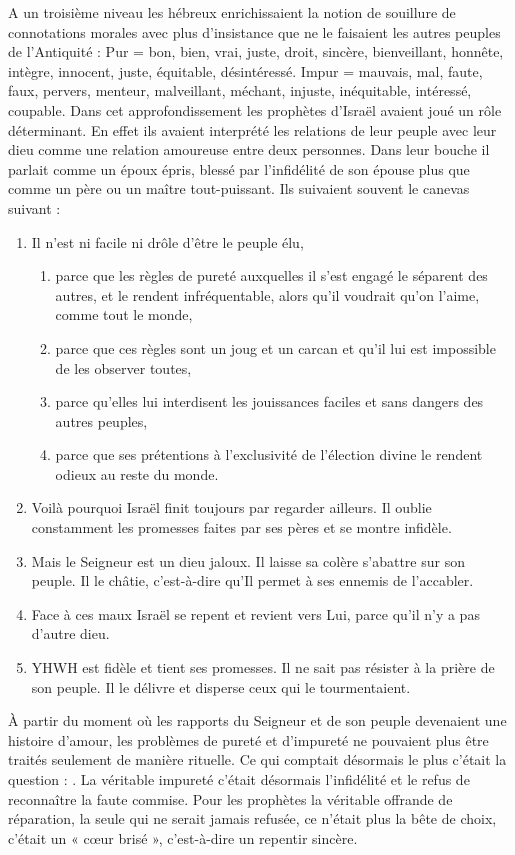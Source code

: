  A un troisième niveau les hébreux enrichissaient la notion de souillure de connotations morales avec plus d'insistance que ne le faisaient les autres peuples de l'Antiquité : Pur = bon, bien, vrai, juste, droit, sincère, bienveillant, honnête, intègre, innocent, juste, équitable, désintéressé. Impur = mauvais, mal, faute, faux, pervers, menteur, malveillant, méchant, injuste, inéquitable, intéressé, coupable. Dans cet approfondissement les prophètes d'Israël avaient joué un rôle déterminant. En effet ils avaient interprété les relations de leur peuple avec leur dieu comme une relation amoureuse entre deux personnes. Dans leur bouche il parlait comme un époux épris, blessé par l'infidélité de son épouse plus que comme un père ou un maître tout-puissant. 
Ils suivaient souvent le canevas suivant :
\begin{enumerate}
\item Il n'est ni facile ni drôle d'être le peuple élu,
 \begin{enumerate}
 \item parce que les règles de pureté auxquelles il s'est engagé le séparent des autres, et le rendent infréquentable, alors qu'il voudrait qu'on l'aime, comme tout le monde,
 \item parce que ces règles sont un joug et un carcan et qu'il lui est impossible de les observer toutes,
 \item parce qu'elles lui interdisent les jouissances faciles et sans dangers des autres peuples,
 \item parce que ses prétentions à l'exclusivité de l'élection divine le rendent odieux au reste du monde. 
 \end{enumerate}
\item Voilà pourquoi Israël finit toujours par regarder ailleurs. Il oublie constamment les promesses faites par ses pères et se montre infidèle. 
\item Mais le Seigneur est un dieu jaloux. Il laisse sa colère s'abattre sur son peuple. Il le châtie, c'est-à-dire qu'Il permet à ses ennemis de l'accabler. 
\item Face à ces maux Israël se repent et revient vers Lui, parce qu'il n'y a pas d'autre dieu.
\item YHWH est fidèle et tient ses promesses. Il ne sait pas résister à la prière de son peuple. Il le délivre et disperse ceux qui le tourmentaient.
\end{enumerate}

 À partir du moment où les rapports du Seigneur et de son peuple devenaient une histoire d'amour, les problèmes de pureté et d'impureté ne pouvaient plus être traités seulement de manière rituelle. Ce qui comptait désormais le plus c'était la question : . 
La véritable impureté c'était désormais l'infidélité et le refus de reconnaître la faute commise. Pour les prophètes la véritable offrande de réparation, la seule qui ne serait jamais refusée, ce n'était plus la bête de choix, c'était un « cœur brisé », c'est-à-dire un repentir sincère. 

